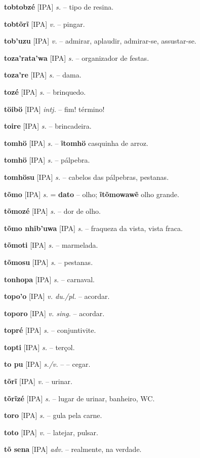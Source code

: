 \textbf{tobtobzé} [IPA] \textit{s.} -- tipo de resina.

\textbf{tobtõrĩ} [IPA] \textit{v.} -- pingar.

\textbf{tob'uzu} [IPA] \textit{v.} -- admirar, aplaudir, admirar-se, assustar-se.

\textbf{toza'rata'wa} [IPA] \textit{s.} -- organizador de festas.

\textbf{toza're} [IPA] \textit{s.} -- dama.

\textbf{tozé} [IPA] \textit{s.} -- brinquedo.

\textbf{töibö} [IPA] \textit{intj.} -- fim! término!

\textbf{toire} [IPA] \textit{s.} -- brincadeira.

\textbf{tomhö} [IPA] \textit{s.} -- \textbf{ĩtomhö} casquinha de arroz.

\textbf{tomhö} [IPA] \textit{s.} -- pálpebra.

\textbf{tomhösu} [IPA] \textit{s.} -- cabelos das pálpebras, pestanas.

\textbf{tõmo} [IPA] \textit{s.} = \textbf{dato} -- olho; \textbf{ĩtõmowawẽ} olho grande.

\textbf{tõmozé} [IPA] \textit{s.} -- dor de olho.

\textbf{tõmo nhib'uwa} [IPA] \textit{s.} -- fraqueza da vista, vista fraca.

\textbf{tõmoti} [IPA] \textit{s.} -- marmelada.

\textbf{tõmosu} [IPA] \textit{s.} -- pestanas.

\textbf{tonhopa} [IPA] \textit{s.} -- carnaval.

\textbf{topo'o} [IPA] \textit{v. du./pl.} -- acordar.

\textbf{toporo} [IPA] \textit{v. sing.} -- acordar.

\textbf{topré} [IPA] \textit{s.} -- conjuntivite.

\textbf{topti} [IPA] \textit{s.} -- terçol.

\textbf{to pu} [IPA] \textit{s./v.} -- -- cegar.

\textbf{tõrĩ} [IPA] \textit{v.} -- urinar.

\textbf{tõrĩzé} [IPA] \textit{s.} -- lugar de urinar, banheiro, WC.

\textbf{toro} [IPA] \textit{s.} -- gula pela carne.

\textbf{toto} [IPA] \textit{v.} -- latejar, pulsar.

\textbf{tõ sena} [IPA] \textit{adv.} -- realmente, na verdade.


